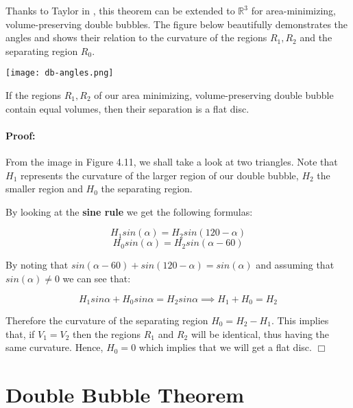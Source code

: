 \documentclass[a4paper,12pt]{report}
\begin{document}
\hspace{-0.66cm}Thanks to Taylor in \cite{taylor}, this theorem can be extended to $\mathbb{R}^{3}$ for area-minimizing, volume-preserving double bubbles. The figure below beautifully demonstrates the angles and shows their relation to the curvature of the regions $R_{1}, R_{2}$ and the separating region $R_{0}$.

\begin{center}
\texttt{[image: db-angles.png]}
\end{center}

\begin{theorem}
If the regions $R_{1}, R_{2}$ of our area minimizing, volume-preserving double bubble contain equal volumes, then their separation is a flat disc.
\end{theorem}

\paragraph{Proof:} 
From the image in Figure 4.11, we shall take a look at two triangles. Note that $H_{1}$ represents the curvature of the larger region of our double bubble, $H_{2}$ the smaller region and $H_{0}$ the separating region.

By looking at the \textbf{sine rule} we get the following formulas:

\begin{equation}
H_{1}sin(\alpha) = H_{2}sin(120-\alpha)
\end{equation}
\vspace{-1cm}
\begin{equation}
H_{0}sin(\alpha) = H_{2}sin(\alpha-60)
\end{equation}

By noting that $sin(\alpha - 60) + sin(120 - \alpha) = sin(\alpha)$ and assuming that $sin(\alpha) \neq 0$ we can see that:

\[
H_{1}sin\alpha + H_{0}sin\alpha = H_{2}sin\alpha \implies H_{1} + H_{0} = H_{2}
\]

Therefore the curvature of the separating region $H_{0} = H_{2} - H_{1}$. This implies that, if $V_{1} = V_{2}$ then the regions $R_{1}$ and $R_{2}$ will be identical, thus having the same curvature. Hence, $H_{0} = 0$ which implies that we will get a flat disc. \hfill $\Box$

\section{Double Bubble Theorem}
\end{document}
